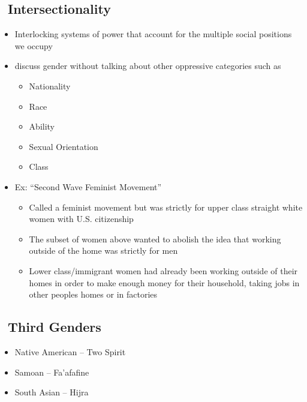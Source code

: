 \documentclass{article}
\begin{document}
\subsection{\ Intersectionality}
\begin{itemize}
  \item Interlocking systems of power that account for the multiple social positions we occupy
  \item {} discuss gender without talking about other oppressive categories such as \begin{itemize}
    \item Nationality
    \item Race
    \item Ability
    \item Sexual Orientation
    \item Class
  \end{itemize}
  \item Ex: ``Second Wave Feminist Movement'' \begin{itemize}
    \item Called a feminist movement but was strictly for upper class straight white women with U.S. citizenship
    \item The subset of women above wanted to abolish the idea that working outside of the home was strictly for men
    \item Lower class/immigrant women had already been working outside of their homes in order to make enough money for their household, taking jobs in other peoples homes or in factories
  \end{itemize}
\end{itemize}

\subsection{\ Third Genders}
\begin{itemize}
  \item Native American -- Two Spirit
  \item Samoan -- Fa'afafine
  \item South Asian -- Hijra
\end{itemize}
\end{document}
